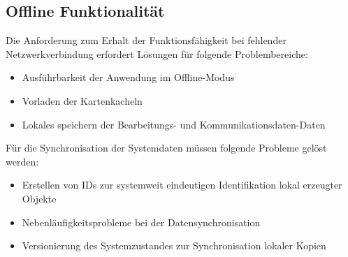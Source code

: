\subsection{Offline Funktionalität}\label{5_OFFL}
Die Anforderung zum Erhalt der Funktionsfähigkeit bei fehlender Netzwerkverbindung erfordert Lösungen für folgende Problembereiche:
\begin{itemize}
	\item Ausführbarkeit der Anwendung im Offline-Modus
	\item Vorladen der Kartenkacheln
	\item Lokales speichern der Bearbeitungs- und Kommunikationsdaten-Daten
\end{itemize}
\vspace{1ex}\noindent
Für die Synchronisation der Systemdaten müssen folgende Probleme gelöst werden:
\begin{itemize}
	\item Erstellen von IDs zur systemweit eindeutigen Identifikation lokal erzeugter Objekte
	\item Nebenläufigkeitsprobleme bei der Datensynchronisation
	\item Versionierung des Systemzustandes zur Synchronisation lokaler Kopien
\end{itemize}

